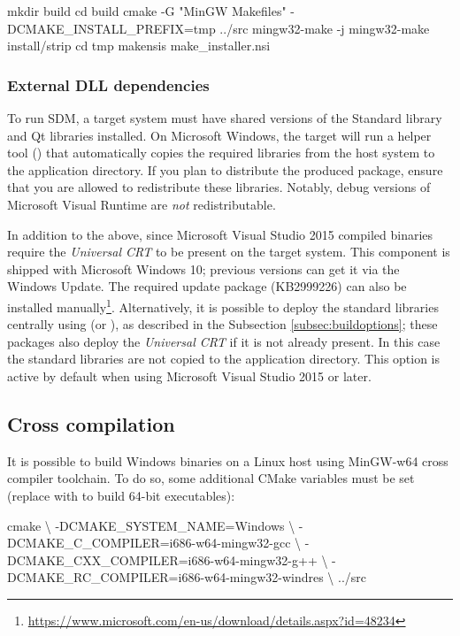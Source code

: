 \documentclass[a4paper,12pt,twoside,extrafontsizes]{memoir}
\begin{document}
\begin{shellcmds}
mkdir build
cd build
cmake -G "MinGW Makefiles" -DCMAKE\_INSTALL\_PREFIX=tmp ../src
mingw32-make -j
mingw32-make install/strip
cd tmp
makensis make\_installer.nsi
\end{shellcmds}

\subsubsection{External DLL dependencies}

To run SDM, a target system must have shared versions of the Standard \cplusplus{} library and Qt libraries installed. On Microsoft Windows, the  target will run a helper tool () that automatically copies the required libraries from the host system to the application directory. If you plan to distribute the produced package, ensure that you are allowed to redistribute these libraries. Notably, debug versions of Microsoft Visual \cplusplus{} Runtime are \emph{not} redistributable.

In addition to the above, since Microsoft Visual Studio 2015 compiled binaries require the \emph{Universal CRT} to be present on the target system. This component is shipped with Microsoft Windows 10; previous versions can get it via the Windows Update. The required update package (KB2999226) can also be installed manually\footnote{\url{https://www.microsoft.com/en-us/download/details.aspx?id=48234}}. Alternatively, it is possible to deploy the standard libraries centrally using  (or ), as described in the Subsection \ref{subsec:buildoptions}; these packages also deploy the \emph{Universal CRT} if it is not already present. In this case the standard libraries are not copied to the application directory. This option is active by default when using Microsoft Visual Studio 2015 or later.

\subsection{Cross compilation}

It is possible to build Windows binaries on a Linux host using MinGW-w64 cross compiler toolchain. To do so, some additional CMake variables must be set (replace  with  to build 64-bit executables):

\begin{shellcmds}
cmake \textbackslash
    -DCMAKE\_SYSTEM\_NAME=Windows \textbackslash
    -DCMAKE\_C\_COMPILER=i686-w64-mingw32-gcc \textbackslash
    -DCMAKE\_CXX\_COMPILER=i686-w64-mingw32-g++ \textbackslash
    -DCMAKE\_RC\_COMPILER=i686-w64-mingw32-windres \textbackslash
    ../src
\end{shellcmds}
\end{document}
